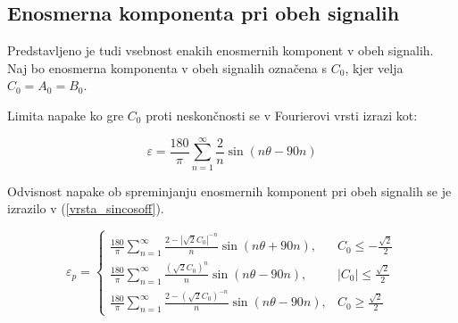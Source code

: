 
\newpage
\subsection{Enosmerna komponenta pri obeh signalih}
\label{2_offseta}
Predstavljeno je tudi vsebnost enakih enosmernih komponent v obeh signalih. Naj bo enosmerna komponenta v obeh signalih označena s $C_0$, kjer velja $C_0= A_0=B_0$.


Limita napake ko gre $C_0$ proti neskončnosti se v Fourierovi vrsti izrazi kot:



\begin{equation}
\varepsilon = \frac{180}{\pi}\sum_{n=1}^{\infty}\frac{2}{n} \sin (n \theta- 90 n)
\end{equation}


Odvisnost napake ob spreminjanju enosmernih komponent pri obeh signalih se je izrazilo v (\ref{vrsta_sincosoff}).


\begin{equation}
\label{vrsta_sincosoff}
\varepsilon_p=
\begin{cases}
\frac{180}{\pi}\sum_{n=1}^{\infty}\frac{2-|\sqrt{2}C_0|^{-n}}{n} \sin (n \theta + 90 n), & C_0\leq -\frac{\sqrt{2}}{2} \\
\frac{180}{\pi}\sum_{n=1}^{\infty}\frac{(\sqrt{2}C_0)^n}{n} \sin (n \theta - 90 n), & |C_0|\leq \frac{\sqrt{2}}{2} \\
\frac{180}{\pi}\sum_{n=1}^{\infty}\frac{2-(\sqrt{2}C_0)^{-n}}{n} \sin (n \theta - 90 n), & C_0\geq \frac{\sqrt{2}}{2}
\end{cases}
\end{equation}


